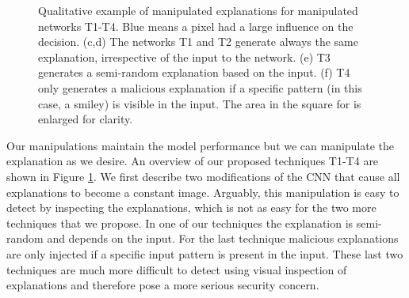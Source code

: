 \documentclass{article}
\begin{document}
\begin{figure}[htb]
{\begin{minipage}{0.3 \textwidth}
\label{fig_expl_T3}
\end{minipage}
}
\caption{Qualitative example of manipulated explanations for manipulated networks T1-T4. Blue means a pixel had a large influence on the decision. (c,d) The networks T1 and T2 generate always the same explanation, irrespective of the input to the network. (e) T3 generates a semi-random explanation based on the input. (f) T4 only generates a malicious explanation if a specific pattern (in this case, a smiley) is visible in the input. The area in the square for is enlarged for clarity.}
\label{fig_T123}
\end{figure}


Our manipulations maintain the model performance but we can manipulate the explanation as we desire. An overview of our proposed techniques T1-T4 are shown in Figure \ref{fig_T123}. 
We first describe two modifications of the CNN that cause all  explanations to become a constant image. Arguably, this manipulation is easy to detect by inspecting the explanations, which is not as easy for the two more techniques that we propose. In one of our techniques the explanation is semi-random and depends on the input. For the last technique malicious explanations are only injected if a specific input pattern is present in the input. These last two techniques are much more difficult to detect using visual inspection of explanations and therefore pose a more serious security concern.
\end{document}
